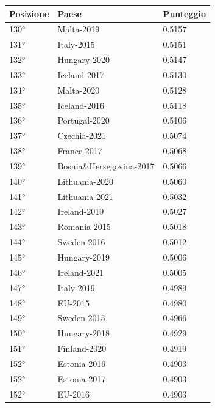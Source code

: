 \documentclass[a4paper,12pt, openright]{report}
\begin{document}
\begin{table}[h!]
    \centering
    \begin{tabular}{ |l|l|l|  }
        \hline
        \textbf{Posizione} & \textbf{Paese} & \textbf{Punteggio} \\
        \hline
        130° & Malta-2019 & 0.5157 \\
        \hline
        131° & Italy-2015  & 0.5151 \\
        \hline
        132° & Hungary-2020 & 0.5147 \\
        \hline
        133° & Iceland-2017 & 0.5130 \\
        \hline
        134° & Malta-2020 & 0.5128 \\
        \hline
        135° & Iceland-2016 & 0.5118 \\
        \hline
        136° & Portugal-2020 & 0.5106 \\
        \hline
        137° & Czechia-2021  & 0.5074 \\
        \hline
        138° & France-2017 & 0.5068 \\
        \hline
        139° & Bosnia\&Herzegovina-2017 & 0.5066 \\
        \hline
        140° & Lithuania-2020 & 0.5060 \\
        \hline
        141° & Lithuania-2021 & 0.5032 \\
        \hline
        142° & Ireland-2019 & 0.5027 \\
        \hline
        143° & Romania-2015  & 0.5018 \\
        \hline
        144° & Sweden-2016 & 0.5012 \\
        \hline
        145° & Hungary-2019 & 0.5006 \\
        \hline
        146° & Ireland-2021 & 0.5005 \\
        \hline
        147° & Italy-2019 & 0.4989 \\
        \hline
        148° & EU-2015 & 0.4980 \\
        \hline
        149° & Sweden-2015  & 0.4966 \\
        \hline
        150° & Hungary-2018 & 0.4929 \\
        \hline
        151° & Finland-2020 & 0.4919 \\
        \hline
        152° & Estonia-2016 & 0.4903 \\
        \hline
        152° & Estonia-2017 & 0.4903 \\
        \hline
        152° & EU-2016 & 0.4903 \\

\end{tabular}
\end{table}
\end{document}
